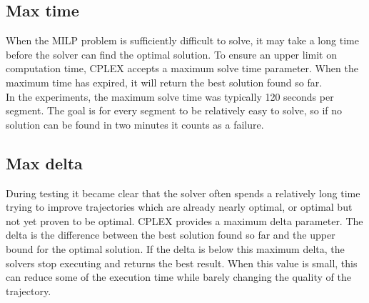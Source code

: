 \subsection{Max time}
When the MILP problem is sufficiently difficult to solve, it may take a long time before the solver can find the optimal solution. To ensure an upper limit on computation time, CPLEX accepts a maximum solve time parameter. When the maximum time has expired, it will return the best solution found so far.\\
In the experiments, the maximum solve time was typically 120 seconds per segment. The goal is for every segment to be relatively easy to solve, so if no solution can be found in two minutes it counts as a failure.
\subsection{Max delta}
During testing it became clear that the solver often spends a relatively long time trying to improve trajectories which are already nearly optimal, or optimal but not yet proven to be optimal. CPLEX provides a maximum delta parameter. The delta is the difference between the best solution found so far and the upper bound for the optimal solution. If the delta is below this maximum delta, the solvers stop executing and returns the best result. When this value is small, this can reduce some of the execution time while barely changing the quality of the trajectory.

